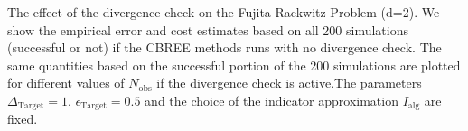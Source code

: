 The effect of the divergence check on the Fujita Rackwitz Problem (d=2). We show the empirical error and cost estimates based on all 200 simulations (successful or not) if the CBREE methods runs with no divergence check. The same quantities  based on the successful portion of the 200 simulations are plotted for different values of $N_\text{obs}$ if the divergence check is active.The parameters $\Delta_{\text{Target}}=1$,  $\epsilon_{\text{Target}} = 0.5$ and the choice of the indicator approximation $I_\text{alg}$ are fixed.